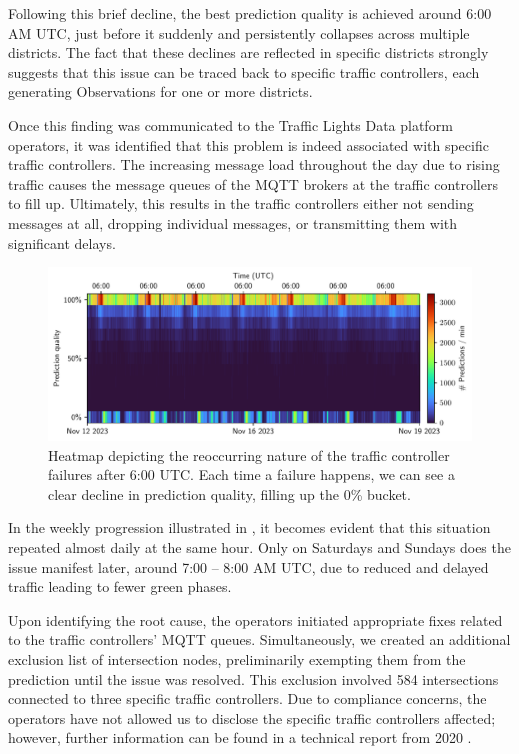 Following this brief decline, the best prediction quality is achieved around 6:00 AM UTC, just before it suddenly and persistently collapses across multiple districts. The fact that these declines are reflected in specific districts strongly suggests that this issue can be traced back to specific traffic controllers, each generating Observations for one or more districts. 

Once this finding was communicated to the Traffic Lights Data platform operators, it was identified that this problem is indeed associated with specific traffic controllers. The increasing message load throughout the day due to rising traffic causes the message queues of the MQTT brokers at the traffic controllers to fill up. Ultimately, this results in the traffic controllers either not sending messages at all, dropping individual messages, or transmitting them with significant delays.

\begin{figure}[t]
    \centering
    \includegraphics[width=\linewidth]{images/monitoring-7-days.pdf}
    \caption{Heatmap depicting the reoccurring nature of the traffic controller failures after 6:00 UTC. Each time a failure happens, we can see a clear decline in prediction quality, filling up the 0\% bucket.}\label{fig:monitoring-7-days}
\end{figure}

In the weekly progression illustrated in , it becomes evident that this situation repeated almost daily at the same hour. Only on Saturdays and Sundays does the issue manifest later, around 7:00 -- 8:00 AM UTC, due to reduced and delayed traffic leading to fewer green phases.

Upon identifying the root cause, the operators initiated appropriate fixes related to the traffic controllers' MQTT queues. Simultaneously, we created an additional exclusion list of intersection nodes, preliminarily exempting them from the prediction until the issue was resolved. This exclusion involved 584 intersections connected to three specific traffic controllers. Due to compliance concerns, the operators have not allowed us to disclose the specific traffic controllers affected; however, further information can be found in a technical report from 2020 \cite{neuner_leitfaden_2020}. 

